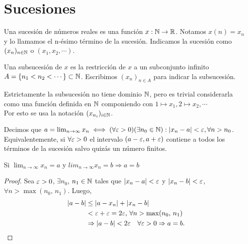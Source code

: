 \section{Sucesiones}

Una sucesión de números reales es una función $x: \mathbb{N} \to \mathbb{R}$. Notamos $x(n) = x_n$ y lo llamamos el n-ésimo término de la sucesión. Indicamos la sucesión como $(x_n)_{n \in \mathbb{N}}$ o $(x_1, x_2, \cdots)$.

Una subsucesión de $x$ es la restricción de $x$ a un subconjunto infinito $A = \{ n_1 < n_2 < \cdots \} \subset \mathbb{N}$. Escribimos $(x_n)_{n \in A}$ para indicar la subsucesión.

\begin{note}
  Estrictamente la subsucesión no tiene dominio $\mathbb{N}$, pero es trivial considerarla como una función definida en $\mathbb{N}$ componiendo con $1 \mapsto x_1, 2 \mapsto x_2, \cdots$ \\
  Por esto se usa la notación $(x_{n_i})_{i \in \mathbb{N}}$.
\end{note}

\begin{definition}
  Decimos que $a = \lim_{n \to \infty} x_n \iff (\forall \varepsilon > 0)(\exists n_0 \in \mathbb{N}) : |x_n - a| < \varepsilon, \forall n > n_0$. \\
  Equivalentemente, si $\forall \varepsilon > 0$ el intervalo $(a-\varepsilon, a+\varepsilon)$ contiene a todos los términos de la sucesión salvo quizás un número finitos.
\end{definition}

\begin{theorem}
  Si $\lim_{n \to \infty} x_n = a$ y $lim_{n \to \infty} x_n = b \Rightarrow a=b$
  \begin{proof}
    Sea $\varepsilon > 0$, $\exists n_0$, $n_1 \in \mathbb{N}$ tales que $|x_n - a| < \varepsilon$ y $|x_n - b| < \varepsilon$, $\forall n > \max(n_0\text{, } n_1)$. Luego, \begin{align*}
      |a - b| & \leq |a - x_n| + |x_n - b|                                                                                  \\
              & < \varepsilon + \varepsilon = 2\varepsilon\text{, } \forall n > \max(n_0\text{, } n_1)                                                 \\
              & \Rightarrow |a - b| < 2\varepsilon \quad \forall \varepsilon > 0 \Rightarrow a = b.
    \end{align*}
  \end{proof}
\end{theorem}

\clearpage

